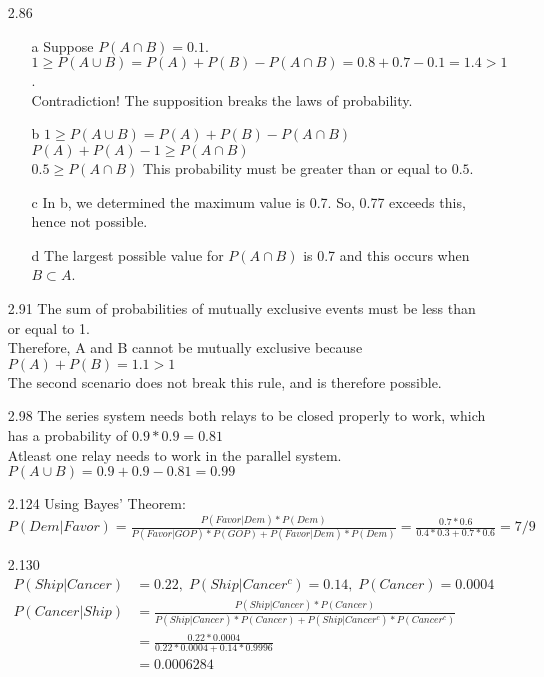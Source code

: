 \documentclass[11pt]{article}
\begin{document}
\begin{enumerate}
        \item[2.86]
        \begin{enumerate}
            \item[a] Suppose $P(A \cap B) = 0.1$. \\
                    $1 \geq P(A \cup B) = P(A) + P(B) - P(A \cap B) = 0.8 + 0.7 - 0.1 = 1.4 > 1$. \\
                    Contradiction! The supposition breaks the laws of probability.
            \item[b] $1 \geq P(A \cup B) = P(A) + P(B) - P(A \cap B)$ \\
                    $P(A) + P(A) - 1 \geq P(A \cap B)$ \\
                    $0.5 \geq P(A \cap B)$ This probability must be greater than or equal to $0.5$.
            \item[c] In b, we determined the maximum value is 0.7. So, 0.77 exceeds this, hence not possible.
            \item[d] The largest possible value for $P(A \cap B)$ is 0.7 and this occurs when $B \subset A$.
        \end{enumerate}

        \item[2.91] The sum of probabilities of mutually exclusive events must be less than or equal to 1. \\
                    Therefore, A and B cannot be mutually exclusive because $P(A) + P(B) = 1.1 > 1$ \\
                    The second scenario does not break this rule, and is therefore possible.

        \item[2.98] The series system needs both relays to be closed properly to work, which has a probability of $0.9 * 0.9 = 0.81$ \\
                    Atleast one relay needs to work in the parallel system. $P(A \cup B) = 0.9 + 0.9 - 0.81 = 0.99$

        \item[2.124] Using Bayes' Theorem: \\
                     $P(Dem | Favor) = \frac{P(Favor | Dem)*P(Dem)}{P(Favor | GOP)*P(GOP) + P(Favor | Dem)*P(Dem)} = \frac{0.7 * 0.6}{0.4 * 0.3 + 0.7 * 0.6} = 7/9$

        \newpage
        \item[2.130]
        \begin{align*}
            P(Ship | Cancer) &= 0.22,\; P(Ship | Cancer^c) = 0.14,\; P(Cancer) = 0.0004 \\
            P(Cancer | Ship) &= \frac{P(Ship | Cancer) * P(Cancer)}{P(Ship | Cancer) * P(Cancer) + P(Ship | Cancer^c) * P(Cancer^c)} \\
            &= \frac{0.22 * 0.0004}{0.22 * 0.0004 + 0.14 * 0.9996} \\
            &= 0.0006284
        \end{align*}


\end{enumerate}
\end{document}
